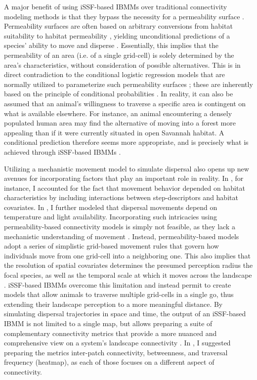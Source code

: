 \documentclass[../FinalThesis.tex]{subfiles}
\begin{document}
A major benefit of using iSSF-based IBMMs over traditional connectivity modeling
methods is that they bypass the necessity for a permeability surface
\citep{Diniz.2019, UnnithanKumar.2022a}. Permeability surfaces are often based
on arbitrary conversions from habitat suitability to habitat permeability
\citep{Zeller.2018}, yielding unconditional predictions of a species' ability to
move and disperse \citep{Signer.2017}. Essentially, this implies that the
permeability of an area (i.e. of a single grid-cell) is solely determined by the
area's characteristics, without consideration of possible alternatives. This is
in direct contradiction to the conditional logistic regression models that are
normally utilized to parameterize such permeability surfaces
\citep{Zeller.2012}; these are inherently based on the principle of conditional
probabilities \citep{Avgar.2017}. In reality, it can also be assumed that an
animal's willingness to traverse a specific area is contingent on what is
available elsewhere. For instance, an animal encountering a densely populated
human area may find the alternative of moving into a forest more appealing than
if it were currently situated in open Savannah habitat. A conditional prediction
therefore seems more appropriate, and is precisely what is achieved through
iSSF-based IBMMs \citep{Signer.2017}.

Utilizing a mechanistic movement model to simulate dispersal also opens up new
avenues for incorporating factors that play an important role in reality. In
, for instance, I accounted for the fact that movement
behavior depended on habitat characteristics by including interactions between
step-descriptors and habitat covariates. In , I further
modeled that dispersal movements depend on temperature and light availability.
Incorporating such intricacies using permeability-based connectivity models is
simply not feasible, as they lack a mechanistic understanding of movement
\citep{Zeller.2012}. Instead, permeability-based models adopt a series of
simplistic grid-based movement rules that govern how individuals move from one
grid-cell into a neighboring one. This also implies that the resolution of
spatial covariates determines the presumed perception radius the focal species,
as well as the temporal scale at which it moves across the landscape
\citep{Diniz.2019}. iSSF-based IBMMs overcome this limitation and instead permit
to create models that allow animals to traverse multiple grid-cells in a single
go, thus extending their landscape perception to a more meaningful distance. By
simulating dispersal trajectories in space and time, the output of an iSSF-based
IBMM is not limited to a single map, but allows preparing a suite of
complementary connectivity metrics that provide a more nuanced and comprehensive
view on a system's landscape connectivity \citep{Diniz.2019}. In
, I suggested preparing the metrics inter-patch
connectivity, betweenness, and traversal frequency (heatmap), as each of those
focuses on a different aspect of connectivity.
\end{document}
